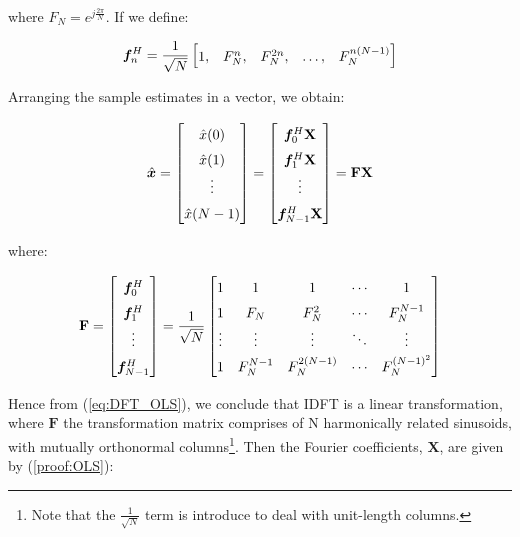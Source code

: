 \begin{enumerate}[label=\alph*), leftmargin=*]
where $F_{N} = e^{j \frac{2\pi}{N}}$. If we define:

\begin{equation}
    \renewcommand\arraystretch{1.5}
    \vf_{n}^{H} = \frac{1}{\sqrt{N}}
    \begin{bmatrix}
        1, & F_{N}^{n}, & F_{N}^{2n}, & \ldots, & F_{N}^{n(N-1)}
    \end{bmatrix}
\end{equation}

Arranging the sample estimates in a vector, we obtain:

\begin{equation}
    \renewcommand\arraystretch{1.5}
    \hat{\vx} =
    \begin{bmatrix}
        \hat{x}(0) \\ \hat{x}(1) \\ \vdots \\ \hat{x}(N-1)
    \end{bmatrix}
    =
    \begin{bmatrix}
        \vf_{0}^{H} \mathbf{X} \\ \vf_{1}^{H} \mathbf{X} \\ \vdots \\ \vf_{N-1}^{H} \mathbf{X}
    \end{bmatrix}
    =
    \mathbf{F} \mathbf{X}
\label{eq:DFT_OLS}
\end{equation}

where:

\begin{equation}
    \renewcommand\arraystretch{1.5}
    \mathbf{F} =
    \begin{bmatrix}
        \vf_{0}^{H} \\ \vf_{1}^{H} \\ \vdots \\ \vf_{N-1}^{H}
    \end{bmatrix}
    = \frac{1}{\sqrt{N}}
    \begin{bmatrix}
        1 & 1 & 1 & \cdots & 1 \\
        1 & F_{N} & F_{N}^{2} & \cdots & F_{N}^{N-1} \\
        \vdots & \vdots & \vdots & \ddots & \vdots \\
        1 & F_{N}^{N-1} & F_{N}^{2(N-1)} & \cdots & F_{N}^{(N-1)^{2}} \\
    \end{bmatrix}
\end{equation}

Hence from (\ref{eq:DFT_OLS}), we conclude that IDFT is a linear transformation, where $\mathbf{F}$ the transformation matrix comprises of N harmonically related sinusoids,
with mutually orthonormal columns\footnote{Note that the $\frac{1}{\sqrt{N}}$ term is introduce to deal with unit-length columns.}. Then the Fourier coefficients, $\mathbf{X}$, are given by (\ref{proof:OLS}):


\end{enumerate}
